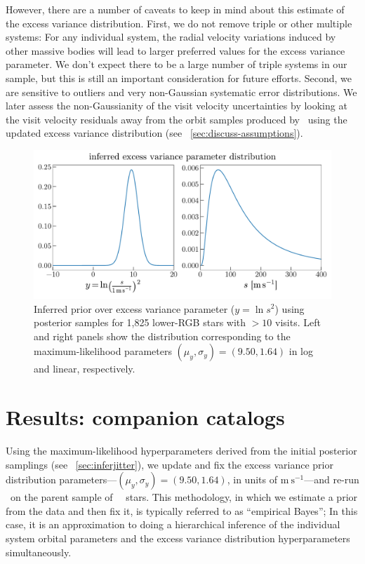\documentclass[modern, letterpaper]{aastex62}
\newcommand{\apogee}{\project{\acronym{APOGEE}}}
\newcommand{\thejoker}{\project{The~Joker}}
\newcommand{\DR}{\acronym{DR14}}
\begin{document}
However, there are a number of caveats to keep in mind about this estimate of
the excess variance distribution.
First, we do not remove triple or other multiple systems: For any individual
system, the radial velocity variations induced by other massive bodies will lead
to larger preferred values for the excess variance parameter.
We don't expect there to be a large number of triple systems in our sample, but
this is still an important consideration for future efforts.
Second, we are sensitive to outliers and very non-Gaussian systematic error
distributions.
We later assess the non-Gaussianity of the visit velocity uncertainties by
looking at the visit velocity residuals away from the orbit samples produced by
\thejoker\ using the updated excess variance distribution (see
\sectionname~\ref{sec:discuss-assumptions}).

\begin{figure}[h]
\begin{center}
\includegraphics[width=\textwidth]{infer-jitter}
\end{center}
\caption{%
Inferred prior over excess variance parameter ($y = \ln s^2$) using posterior
samples for 1,825 lower-RGB stars with $>10$ visits.
Left and right panels show the distribution corresponding to the
maximum-likelihood parameters $(\mu_y, \sigma_y) = (9.50, 1.64)$ in log and
linear, respectively.
\label{fig:infer-jitter}
}
\end{figure}


\section{Results: companion catalogs}
\label{sec:results}

Using the maximum-likelihood hyperparameters derived from the initial posterior
samplings (see \sectionname~\ref{sec:inferjitter}), we update and fix the
excess variance prior distribution parameters---$(\mu_{y}, \sigma_{y}) = (9.50,
1.64)$, in units of $\textrm{m}~\textrm{s}^{-1}$---and re-run \thejoker\ on the
parent sample of \apogee\ \DR\ stars.
This methodology, in which we estimate a prior from the data and then fix it, is
typically referred to as ``empirical Bayes''; In this case, it is an
approximation to doing a hierarchical inference of the individual system orbital
parameters and the excess variance distribution hyperparameters simultaneously.
\end{document}

